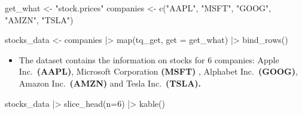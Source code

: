 \documentclass[
  letterpaper,
  DIV=11,
  numbers=noendperiod]{scrreprt}
\newenvironment{Shaded}{\begin{snugshade}}{\end{snugshade}}
\newcommand{\AttributeTok}[1]{\textcolor[rgb]{0.40,0.45,0.13}{#1}}
\newcommand{\DecValTok}[1]{\textcolor[rgb]{0.68,0.00,0.00}{#1}}
\newcommand{\FunctionTok}[1]{\textcolor[rgb]{0.28,0.35,0.67}{#1}}
\newcommand{\NormalTok}[1]{\textcolor[rgb]{0.00,0.23,0.31}{#1}}
\newcommand{\OtherTok}[1]{\textcolor[rgb]{0.00,0.23,0.31}{#1}}
\newcommand{\SpecialCharTok}[1]{\textcolor[rgb]{0.37,0.37,0.37}{#1}}
\newcommand{\StringTok}[1]{\textcolor[rgb]{0.13,0.47,0.30}{#1}}
\providecommand{\tightlist}{%
  \setlength{\itemsep}{0pt}\setlength{\parskip}{0pt}}\usepackage{longtable,booktabs,array}
\theoremstyle{definition}
\theoremstyle{remark}
\begin{document}
\begin{Shaded}
\begin{Highlighting}[]
\NormalTok{get\_what }\OtherTok{\textless{}{-}} \StringTok{"stock.prices"}
\NormalTok{companies }\OtherTok{\textless{}{-}} \FunctionTok{c}\NormalTok{(}\StringTok{"AAPL"}\NormalTok{,}
             \StringTok{"MSFT"}\NormalTok{,}
             \StringTok{"GOOG"}\NormalTok{,}
             \StringTok{"AMZN"}\NormalTok{,}
             \StringTok{"TSLA"}\NormalTok{)}

\NormalTok{stocks\_data }\OtherTok{\textless{}{-}} 
\NormalTok{  companies }\SpecialCharTok{|\textgreater{}} 
  \FunctionTok{map}\NormalTok{(tq\_get, }\AttributeTok{get =}\NormalTok{ get\_what) }\SpecialCharTok{|\textgreater{}} 
  \FunctionTok{bind\_rows}\NormalTok{()}
\end{Highlighting}
\end{Shaded}

\begin{itemize}
\tightlist
\item
  The dataset contains the information on stocks for 6 companies: Apple
  Inc.~\textbf{(AAPL)}, Microsoft Corporation \textbf{(MSFT)} , Alphabet
  Inc.~\textbf{(GOOG)}, Amazon Inc.~\textbf{(AMZN)} and Tesla
  Inc.~\textbf{(TSLA).}
\end{itemize}

\begin{Shaded}
\begin{Highlighting}[]
\NormalTok{stocks\_data }\SpecialCharTok{|\textgreater{}} 
  \FunctionTok{slice\_head}\NormalTok{(}\AttributeTok{n=}\DecValTok{6}\NormalTok{) }\SpecialCharTok{|\textgreater{}} 
  \FunctionTok{kable}\NormalTok{()}
\end{Highlighting}
\end{Shaded}
\end{document}
